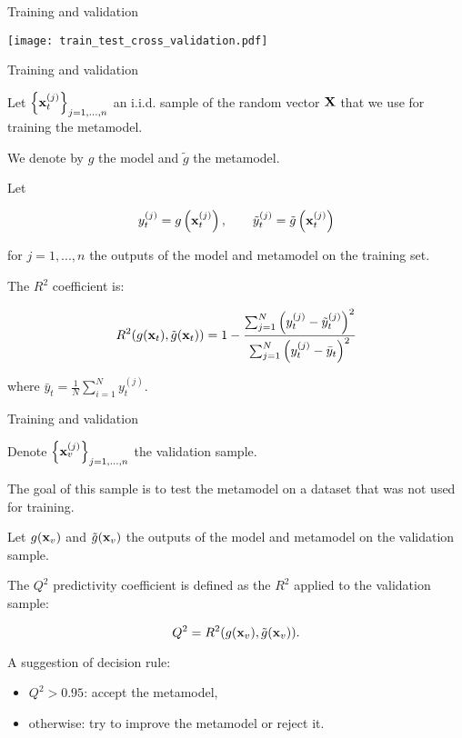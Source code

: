 \documentclass{beamer}
\begin{document}

\begin{frame}[t]{Training and validation}

\begin{center}
 \texttt{[image: train\_test\_cross\_validation.pdf]}
\end{center}

\end{frame}


\begin{frame}[t]{Training and validation}

Let $\left\{{\bf x}^{(j)}_t\right\}_{j=1,...,n}$ an i.i.d. sample 
of the random vector ${\bf X}$ that we use for training the 
metamodel. 

We denote by $g$ the model and $\tilde{g}$ the metamodel. 

Let 

$$
y^{(j)}_t = g\left({\bf x}^{(j)}_t\right), \qquad 
\tilde{y}^{(j)}_t = \tilde{g}\left({\bf x}^{(j)}_t\right)
$$

for $j=1,...,n$ the outputs of the model and metamodel 
on the training set.

The $R^2$ coefficient is: 

$$
R^2(g({\bf x}_t),\tilde{g}({\bf x}_t)) 
= 1 - \frac{ \sum_{j=1}^N \left( y^{(j)}_t - \tilde{y}^{(j)}_t \right)^2}
{ \sum_{j=1}^N \left( y^{(j)}_t - \bar{y}_t \right)^2 }
$$

where $\bar{y}_t = \frac{1} {N} \sum_{i=1}^N y^{(j)}_t$. 

\end{frame}


\begin{frame}[t]{Training and validation}

Denote $\left\{{\bf x}^{(j)}_v\right\}_{j=1,...,n}$ the 
validation sample. 

The goal of this sample is to test the metamodel on a dataset 
that was not used for training.

Let $g({\bf x}_v)$ and $\tilde{g}({\bf x}_v)$ the outputs of the 
model and metamodel on the validation sample.

The $Q^2$ predictivity coefficient is defined as the $R^2$ 
applied to the validation sample:

$$
Q^2 = R^2(g({\bf x}_v),\tilde{g}({\bf x}_v)).
$$

A suggestion of decision rule:
\begin{itemize}
\item $Q^2>0.95$: accept the metamodel,
\item otherwise: try to improve the metamodel or reject it.
\end{itemize}

\end{frame}
\end{document}
